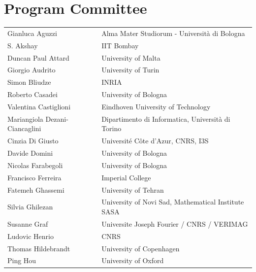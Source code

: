\documentclass[]{llncs}
\begin{document}
\section*{Program Committee}
\noindent
\begin{longtable}{p{}p{}}
Gianluca Aguzzi & Alma Mater Studiorum - Universit\`a di Bologna\\

S. Akshay & IIT Bombay\\

Duncan Paul Attard & University of Malta\\

Giorgio Audrito & University of Turin\\

Simon Bliudze & INRIA\\

Roberto Casadei & University of Bologna\\

Valentina Castiglioni & Eindhoven University of Technology\\

Mariangiola Dezani-Ciancaglini & Dipartimento di Informatica, Universit\`a di Torino\\

Cinzia Di Giusto & Universit\'e C\^ote d'Azur, CNRS, I3S\\

Davide Domini & University of Bologna\\

Nicolas Farabegoli & University of Bologna\\

Francisco Ferreira & Imperial College\\

Fatemeh Ghassemi & University of Tehran\\

Silvia Ghilezan & University of Novi Sad, Mathematical Institute SASA\\

Susanne Graf & Universite Joseph Fourier / CNRS / VERIMAG\\

Ludovic Henrio & CNRS\\

Thomas Hildebrandt & University of Copenhagen\\

Ping Hou & University of Oxford\\


\end{longtable}
\end{document}
